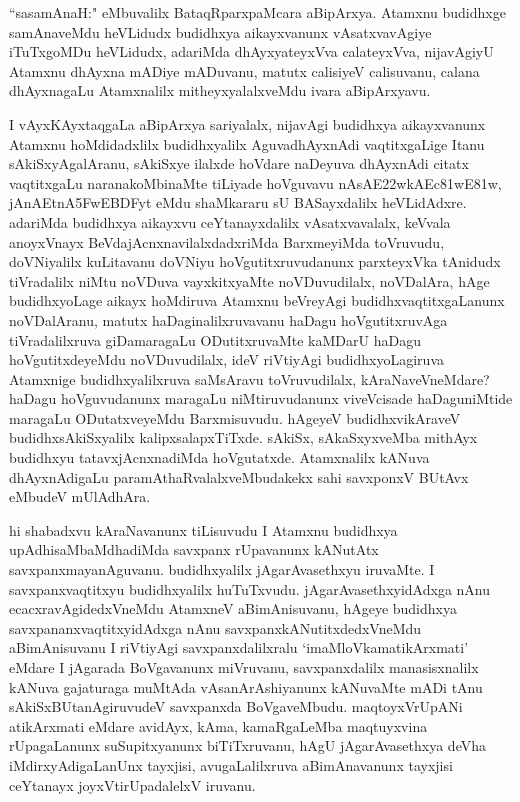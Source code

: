 \begin{artha}
``sasamAnaH:" eMbuvalilx BataqRparxpaMcara aBipArxya. Atamxnu budidhxge samAnaveMdu heVLidudx budidhxya aikayxvanunx vAsatxvavAgiye iTuTxgoMDu heVLidudx, adariMda dhAyxyateyxVva calateyxVva, nijavAgiyU Atamxnu dhAyxna mADiye mADuvanu, matutx calisiyeV calisuvanu, calana dhAyxnagaLu Atamxnalilx mitheyxyalalxveMdu ivara aBipArxyavu.

I vAyxKAyxtaqgaLa aBipArxya sariyalalx, nijavAgi budidhxya aikayxvanunx Atamxnu hoMdidadxlilx budidhxyalilx AguvadhAyxnAdi vaqtitxgaLige Itanu sAkiSxyAgalAranu, sAkiSxye ilalxde hoVdare naDeyuva dhAyxnAdi citatx vaqtitxgaLu naranakoMbinaMte tiLiyade hoVguvavu {\dn nAsAE\322wkAEc\381wE\381w,  jAnAEtnA\35FwEBDFyt\?} eMdu shaMkararu sU BASayxdalilx heVLidAdxre. adariMda budidhxya aikayxvu ceYtanayxdalilx vAsatxvavalalx, keVvala anoyxVnayx BeVdajAcnxnavilalxdadxriMda BarxmeyiMda toVruvudu, doVNiyalilx kuLitavanu doVNiyu hoVgutitxruvudanunx parxteyxVka tAnidudx tiVradalilx niMtu noVDuva vayxkitxyaMte noVDuvudilalx, noVDalAra, hAge budidhxyoLage aikayx hoMdiruva Atamxnu beVreyAgi budidhxvaqtitxgaLanunx noVDalAranu, matutx haDaginalilxruvavanu haDagu hoVgutitxruvAga tiVradalilxruva giDamaragaLu ODutitxruvaMte kaMDarU haDagu hoVgutitxdeyeMdu noVDuvudilalx, ideV riVtiyAgi budidhxyoLagiruva Atamxnige budidhxyalilxruva saMsAravu toVruvudilalx, kAraNaveVneMdare? haDagu hoVguvudanunx maragaLu niMtiruvudanunx viveVcisade haDaguniMtide maragaLu ODutatxveyeMdu Barxmisuvudu. hAgeyeV budidhxvikAraveV budidhxsAkiSxyalilx kalipxsalapxTiTxde. sAkiSx, sAkaSxyxveMba mithAyx budidhxyu tatavxjAcnxnadiMda hoVgutatxde. Atamxnalilx kANuva dhAyxnAdigaLu paramAthaRvalalxveMbudakekx sahi savxponxV BUtAvx eMbudeV mUlAdhAra. 
\end{artha}


\begin{artha}
hi shabadxvu kAraNavanunx tiLisuvudu I Atamxnu budidhxya upAdhisaMbaMdhadiMda savxpanx rUpavanunx kANutAtx savxpanxmayanAguvanu. budidhxyalilx jAgarAvasethxyu iruvaMte. I savxpanxvaqtitxyu budidhxyalilx huTuTxvudu. jAgarAvasethxyidAdxga nAnu ecacxravAgidedxVneMdu AtamxneV aBimAnisuvanu, hAgeye budidhxya savxpananxvaqtitxyidAdxga nAnu savxpanxkANutitxdedxVneMdu aBimAnisuvanu I riVtiyAgi savxpanxdalilxralu `imaMloVkamatikArxmati' eMdare I jAgarada BoVgavanunx miVruvanu, savxpanxdalilx manasisxnalilx kANuva gajaturaga muMtAda vAsanArAshiyanunx kANuvaMte mADi tAnu sAkiSxBUtanAgiruvudeV savxpanxda BoVgaveMbudu. maqtoyxVrUpANi atikArxmati eMdare avidAyx, kAma, kamaRgaLeMba maqtuyxvina rUpagaLanunx suSupitxyanunx biTiTxruvanu, hAgU jAgarAvasethxya deVha iMdirxyAdigaLanUnx tayxjisi, avugaLalilxruva aBimAnavanunx tayxjisi ceYtanayx joyxVtirUpadalelxV iruvanu.
\end{artha}

